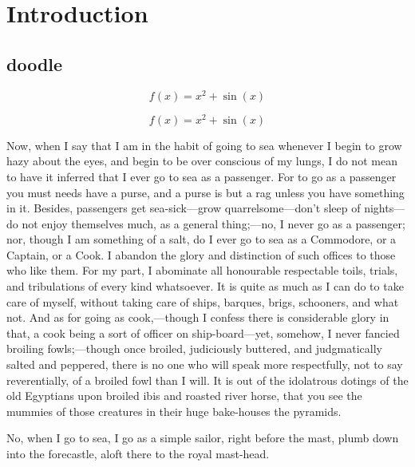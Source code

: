 \chapter{Introduction}

\section{doodle}

\begin{equation}
    f(x)=x^2+\sin(x)
\end{equation}

\begin{equation}
    f(x)=x^2+\sin(x)
    \end{equation}



Now, when I say that I am in the habit of going to sea whenever I begin to grow
hazy about the eyes, and begin to be over conscious of my lungs, I do not mean
to have it inferred that I ever go to sea as a passenger. For to go as a
passenger you must needs have a purse, and a purse is but a rag unless you have
something in it. Besides, passengers get sea-sick—grow quarrelsome—don't sleep
of nights—do not enjoy themselves much, as a general thing;—no, I never go as a
passenger; nor, though I am something of a salt, do I ever go to sea as a
Commodore, or a Captain, or a Cook. I abandon the glory and distinction of such
offices to those who like them. For my part, I abominate all honourable
respectable toils, trials, and tribulations of every kind whatsoever. It is
quite as much as I can do to take care of myself, without taking care of ships,
barques, brigs, schooners, and what not. And as for going as cook,—though I
confess there is considerable glory in that, a cook being a sort of officer on
ship-board—yet, somehow, I never fancied broiling fowls;—though once broiled,
judiciously buttered, and judgmatically salted and peppered, there is no one who
will speak more respectfully, not to say reverentially, of a broiled fowl than I
will. It is out of the idolatrous dotings of the old Egyptians upon broiled ibis
and roasted river horse, that you see the mummies of those creatures in their
huge bake-houses the pyramids.

No, when I go to sea, I go as a simple sailor, right before the mast, plumb down
into the forecastle, aloft there to the royal mast-head. 

